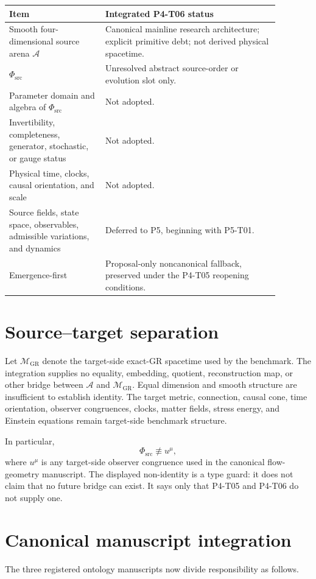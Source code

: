\documentclass[11pt]{article}
\newcommand{\A}{\mathcal A}
\newcommand{\PhiSrc}{\Phi_{\mathrm{src}}}
\newcommand{\MGR}{\mathcal M_{\mathrm{GR}}}
\begin{document}
\begin{longtable}{p{0.31\linewidth}p{0.57\linewidth}}
\toprule
Item & Integrated P4-T06 status \\
\midrule
\endhead
Smooth four-dimensional source arena \(\A\) & Canonical mainline research
architecture; explicit primitive debt; not derived physical spacetime. \\
\(\PhiSrc\) & Unresolved abstract source-order or evolution slot only. \\
Parameter domain and algebra of \(\PhiSrc\) & Not adopted. \\
Invertibility, completeness, generator, stochastic, or gauge status & Not
adopted. \\
Physical time, clocks, causal orientation, and scale & Not adopted. \\
Source fields, state space, observables, admissible variations, and dynamics
& Deferred to P5, beginning with P5-T01. \\
Emergence-first & Proposal-only noncanonical fallback, preserved under the
P4-T05 reopening conditions. \\
\bottomrule
\end{longtable}

\section{Source--target separation}

Let \(\MGR\) denote the target-side exact-GR spacetime used by the benchmark.
The integration supplies no equality, embedding, quotient, reconstruction
map, or other bridge between \(\A\) and \(\MGR\). Equal dimension and smooth
structure are insufficient to establish identity. The target metric,
connection, causal cone, time orientation, observer congruences, clocks,
matter fields, stress energy, and Einstein equations remain target-side
benchmark structure.

In particular,
\[
  \PhiSrc
  \not\equiv
  u^\mu ,
\]
where \(u^\mu\) is any target-side observer congruence used in the canonical
flow-geometry manuscript. The displayed non-identity is a type guard: it does
not claim that no future bridge can exist. It says only that P4-T05 and P4-T06
do not supply one.

\section{Canonical manuscript integration}

The three registered ontology manuscripts now divide responsibility as
follows.
\end{document}
